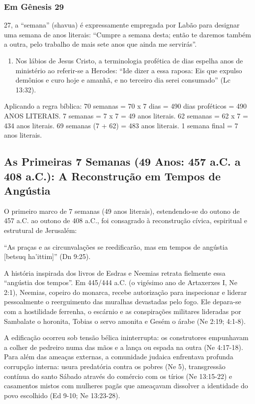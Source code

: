 \subsubsection*{Em Gênesis 29}
27, a ``semana'' (shavua) é expressamente empregada por Labão para designar uma semana de anos literais: ``Cumpre a semana desta; então te daremos também a outra, pelo trabalho de mais sete anos que ainda me servirás''.
\begin{enumerate}
  \item Nos lábios de Jesus Cristo, a terminologia profética de dias espelha anos de ministério ao referir-se a Herodes: ``Ide dizer a essa raposa: Eis que expulso demônios e curo hoje e amanhã, e no terceiro dia serei consumado'' (Lc 13:32).
\end{enumerate}


Aplicando a regra bíblica:
70 semanas = 70 x 7 dias = 490 dias proféticos = 490 ANOS LITERAIS.
7 semanas = 7 x 7 = 49 anos literais.
62 semanas = 62 x 7 = 434 anos literais.
69 semanas (7 + 62) = 483 anos literais.
1 semana final = 7 anos literais.



\subsection{As Primeiras 7 Semanas (49 Anos: 457 a.C. a 408 a.C.): A Reconstrução em Tempos de Angústia}


O primeiro marco de 7 semanas (49 anos literais), estendendo-se do outono de 457 a.C. ao outono de 408 a.C., foi consagrado à reconstrução cívica, espiritual e estrutural de Jerusalém:

``As praças e as circunvalações se reedificarão, mas em tempos de angústia [betsuq ha'ittim]'' (Dn 9:25).

A história inspirada dos livros de Esdras e Neemias retrata fielmente essa ``angústia dos tempos''. Em 445/444 a.C. (o vigésimo ano de Artaxerxes I, Ne 2:1), Neemias, copeiro do monarca, recebe autorização para inspecionar e liderar pessoalmente o reerguimento das muralhas devastadas pelo fogo. Ele depara-se com a hostilidade ferrenha, o escárnio e as conspirações militares lideradas por Sambalate o horonita, Tobias o servo amonita e Gesém o árabe (Ne 2:19; 4:1-8).

A edificação ocorreu sob tensão bélica ininterrupta: os construtores empunhavam a colher de pedreiro numa das mãos e a lança ou espada na outra (Ne 4:17-18). Para além das ameaças externas, a comunidade judaica enfrentava profunda corrupção interna: usura predatória contra os pobres (Ne 5), transgressão contínua do santo Sábado através do comércio com os tírios (Ne 13:15-22) e casamentos mistos com mulheres pagãs que ameaçavam dissolver a identidade do povo escolhido (Ed 9-10; Ne 13:23-28).

